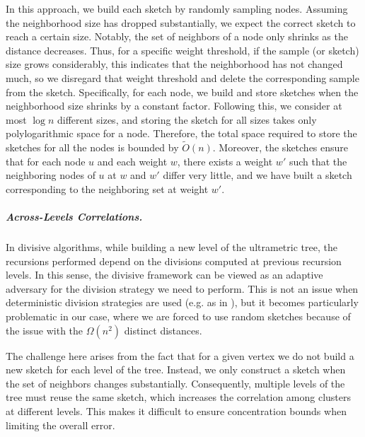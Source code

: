 \documentclass{article}
\begin{document}
In this approach, we build each sketch by randomly sampling nodes. Assuming the neighborhood size has dropped substantially, we expect the correct sketch to reach a certain size. Notably, the set of neighbors of a node only shrinks as the distance decreases. Thus, for a specific weight threshold, if the sample (or sketch) size grows considerably, this indicates that the neighborhood has not changed much, so we disregard that weight threshold and delete the corresponding sample from the sketch. Specifically, for each node, we build and store sketches when the neighborhood size shrinks by a constant factor. Following this, we consider at most \(\log n\) different sizes, and storing the sketch for all sizes takes only polylogarithmic space for a node. Therefore, the total space required to store the sketches for all the nodes is bounded by \(\tilde{O}(n)\). Moreover, the sketches ensure that for each node \(u\) and each weight \(w\), there exists a weight \(w'\) such that the neighboring nodes of \(u\) at \(w\) and \(w'\) differ very little, and we have built a sketch corresponding to the neighboring set at weight \(w'\). 


\subparagraph*{Across-Levels Correlations.} In divisive algorithms, while building a new level of the ultrametric tree, the recursions performed depend on the divisions computed at previous recursion levels.
In this sense, the divisive framework can be viewed as an adaptive adversary for the division strategy we need to perform.
This is not an issue when deterministic division strategies are used (e.g. as in \cite{cohen2022fitting}), but it becomes particularly problematic in our case, where we are forced to use random sketches because of the issue with the $\Omega(n^2)$ distinct distances.

The challenge here arises from the fact that for a given vertex we do not build a new sketch for each level of the tree. Instead, we only construct a sketch when the set of neighbors changes substantially. Consequently, multiple levels of the tree must reuse the same sketch, which increases the correlation among clusters at different levels. This makes it difficult to ensure concentration bounds when limiting the overall error.
\end{document}
